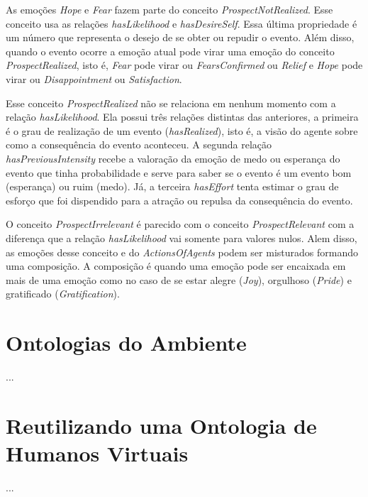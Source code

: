 As emoções \emph{Hope} e \emph{Fear} fazem parte do conceito
\emph{ProspectNotRealized}. Esse conceito usa as relações \emph{hasLikelihood}
e \emph{hasDesireSelf}. Essa última propriedade é um número que
representa o desejo de se obter ou repudir o evento. Além disso, quando o
evento ocorre a emoção atual pode virar uma emoção do conceito
\emph{ProspectRealized}, isto é, \emph{Fear} pode virar ou
\emph{FearsConfirmed} ou \emph{Relief} e \emph{Hope} pode virar ou
\emph{Disappointment} ou \emph{Satisfaction}.

Esse conceito \emph{ProspectRealized} não se relaciona em nenhum momento com a
relação \emph{hasLikelihood}. Ela possui três relações distintas das
anteriores, a primeira é o grau de realização de um evento
(\emph{hasRealized}), isto é, a visão do agente sobre como a consequência do
evento aconteceu. A segunda relação \emph{hasPreviousIntensity} recebe a
valoração da emoção de medo ou esperança do evento que tinha probabilidade e
serve para saber se o evento é um evento bom (esperança) ou ruim (medo). Já, a
terceira \emph{hasEffort} tenta estimar o grau de esforço que foi dispendido
para a atração ou repulsa da consequência do evento.

O conceito \emph{ProspectIrrelevant} é parecido com o conceito
\emph{ProspectRelevant} com a diferença que a relação \emph{hasLikelihood} vai
somente para valores nulos. Alem disso, as emoções desse conceito e do
\emph{ActionsOfAgents} podem ser misturados formando uma composição. A
composição é quando uma emoção pode ser encaixada em mais de uma emoção como
no caso de se estar alegre (\emph{Joy}), orgulhoso (\emph{Pride}) e
gratificado (\emph{Gratification}).


\section{Ontologias do Ambiente} \label{cap:tp:oda}

...

\section{Reutilizando uma Ontologia de Humanos Virtuais} \label{cap:tp:ruodhv}

...
